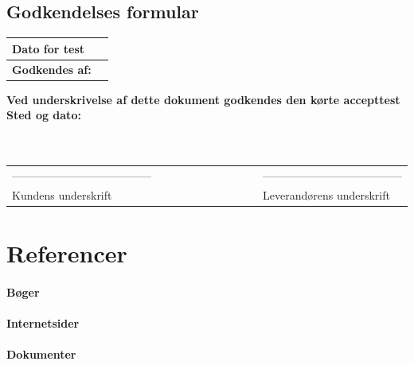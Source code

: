 \section{Godkendelses formular}
\begin{table}[h!]
\label{tab:tabel14}
\begin{tabular}{| l | >{\raggedright\arraybackslash}p{12cm} |}
   \hline
   \textbf{Dato for test} &\\ \hline
   \textbf{Godkendes af:} & \\ \hline
\end{tabular}
\end{table}
\textbf{Ved underskrivelse af dette dokument godkendes den kørte accepttest}
\newline
\textbf{Sted og dato:}\\
\\
\\
\begin{table}
[h!]
\begin{tabular}{ l lllllllll l}
--------------------------------------&&&&&&&&&&--------------------------------------\\ 
Kundens underskrift &&&&&&&&&&Leverandørens underskrift\\
\end{tabular}
\end{table}

\chapter{Referencer}
\subsubsection{Bøger}
\subsubsection{Internetsider}
\subsubsection{Dokumenter}
